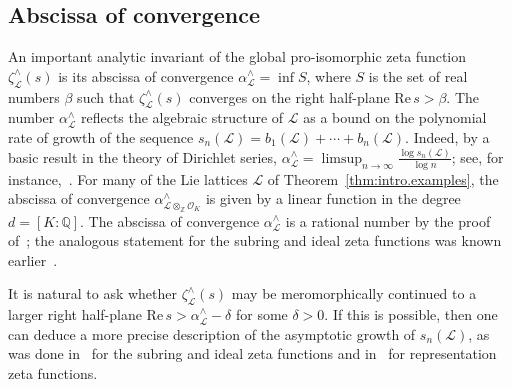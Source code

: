 \documentclass[11pt,a4paper]{amsart}
\theoremstyle{plain}
\theoremstyle{remark}
\newcommand{\Z}{\mathbb{Z}}
\newcommand{\Q}{\mathbb{Q}}
\newcommand{\tensor}{\otimes}
\begin{document}
\subsection{Abscissa of convergence} \label{sec:abscissa}
An important analytic invariant of the global pro-isomorphic zeta function $\zeta^\wedge_{\mathcal{L}}(s)$ is its abscissa of convergence $\alpha^\wedge_{\mathcal{L}} = \inf S$, where $S$ is the set of real numbers $\beta$ such that $\zeta^\wedge_{\mathcal{L}}(s)$ converges on the right half-plane $\mathrm{Re} \, s > \beta$.  
The number $\alpha^\wedge_{\mathcal{L}}$ reflects the algebraic structure of $\mathcal{L}$ as a bound on the polynomial rate of growth of the sequence $s_n(\mathcal{L}) = b_1(\mathcal{L}) + \cdots + b_n(\mathcal{L})$.  Indeed, by a basic result in the theory of Dirichlet series, $\alpha^\wedge_{\mathcal{L}} = \limsup_{n \to \infty} \frac{\log s_n(\mathcal{L})}{\log n}$; see, for instance,~\cite[Theorem~1.3]{MV/07}.  For many of the Lie lattices $\mathcal{L}$ of Theorem~\ref{thm:intro.examples}, the abscissa of convergence $\alpha^\wedge_{\mathcal{L} \tensor_\Z \mathcal{O}_K}$ is given by a linear function in the degree $d = [K : \Q]$.  The abscissa of convergence $\alpha^\wedge_{\mathcal{L}}$ is a rational number by the proof of~\cite[Theorem~7.2]{HMR/18}; the analogous statement for the subring and ideal zeta functions was known earlier~\cite{duSG/00}.  

It is natural to ask whether $\zeta^\wedge_{\mathcal{L}}(s)$ may be meromorphically continued to a larger right half-plane $\mathrm{Re} \, s > \alpha^\wedge_{\mathcal{L}} - \delta$ for some $\delta > 0$.  If this is possible, then one can deduce a more precise description of the asymptotic growth of $s_n(\mathcal{L})$, as was done in~\cite[Theorem~1.7]{duSG/00} for the subring and ideal zeta functions and in~\cite[Theorem~A]{DungVoll/17} for representation zeta functions.
\end{document}
